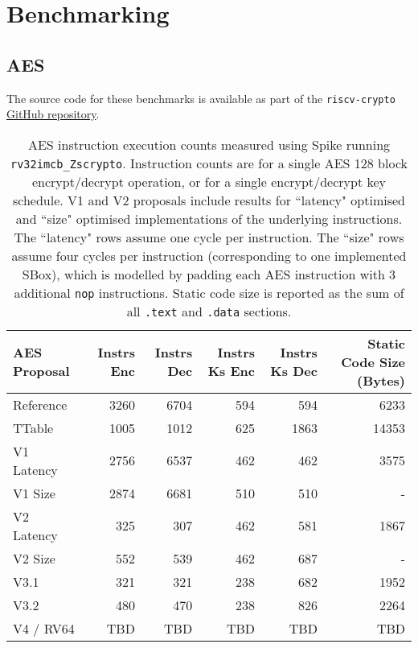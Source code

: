 
\section{Benchmarking}

\subsection{AES}
\label{sec:benchmark:aes}

The source code for these benchmarks is available as part of the
{\tt riscv-crypto} 
\href{https://github.com/scarv/riscv-crypto/tree/master/benchmarks/crypto_block/aes}{GitHub repository}.

\begin{table}[h]
\centering
\begin{tabular}{lrrrrr}
AES Proposal & Instrs Enc & Instrs Dec & Instrs Ks Enc & Instrs Ks Dec & Static Code Size (Bytes) \\ \hline
Reference   & 3260  & 6704  & 594  &  594  & 6233   \\
TTable      & 1005  & 1012  & 625  &  1863 & 14353  \\
V1 Latency  & 2756  & 6537  & 462  &  462  & 3575   \\
V1 Size     & 2874  & 6681  & 510  &  510  & -      \\
V2 Latency  & 325   & 307   & 462  &  581  & 1867   \\
V2 Size     & 552   & 539   & 462  &  687  & -      \\
V3.1        & 321   & 321   & 238  &  682  & 1952   \\
V3.2        & 480   & 470   & 238  &  826  & 2264   \\
V4 / RV64   & TBD   & TBD   & TBD  &  TBD  & TBD     \\
\end{tabular}
\caption{
AES instruction execution counts measured using Spike
running {\tt rv32imcb\_Zscrypto}.
Instruction counts are for a single AES 128 block encrypt/decrypt operation,
or for a single encrypt/decrypt key schedule.
V1 and V2 proposals include results for ``latency" optimised and ``size"
optimised implementations of the underlying instructions.
The ``latency" rows assume one cycle per instruction.
The ``size" rows assume four cycles per instruction (corresponding to
one implemented SBox), which is modelled by padding each AES instruction
with 3 additional {\tt nop} instructions.
Static code size is reported as the sum of all {\tt .text} and {\tt .data}
sections.
}
\label{tab:benchmarks:aes:perf}
\end{table}


